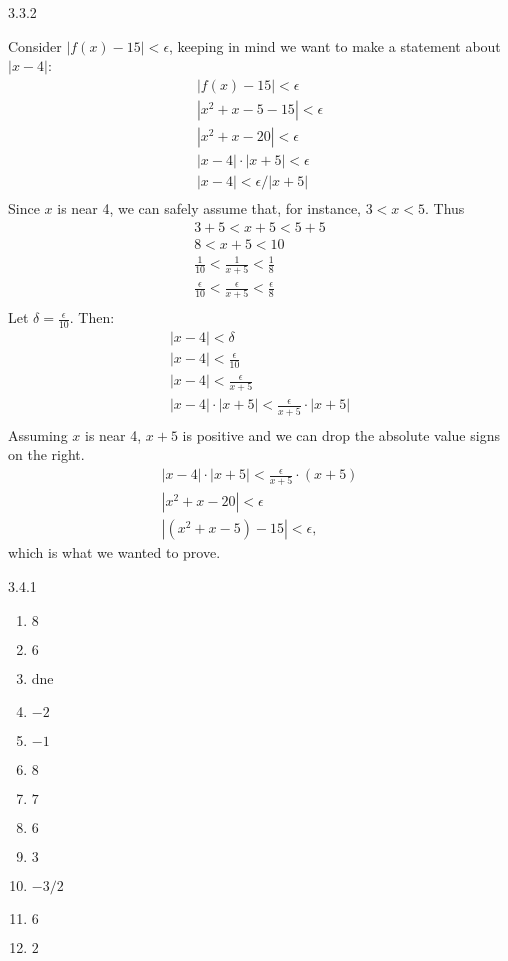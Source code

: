 \begin{Answer}{3.3.2}
\begin{enumerate}
{Consider $|f(x)-15|<\epsilon$, keeping in  mind we want to make a statement about $|x-4|$:
\begin{gather*}
|f(x) -15 | < \epsilon \\
|x^2+x-5 -15 |<\epsilon \\
| x^2+x-20 | < \epsilon \\
| x-4 |\cdot|x+5| < \epsilon \\
| x-4 | < \epsilon/|x+5| \\
\end{gather*}
Since $x$ is near 4, we can safely assume that, for instance, $3<x<5$. Thus
\begin{gather*}
3+5<x+5<5+5 \\
8 < x+5 < 10 \\
\frac{1}{10} < \frac{1}{x+5} < \frac{1}{8} \\
\frac{\epsilon}{10} < \frac{\epsilon}{x+5} < \frac{\epsilon}{8} \\
\end{gather*}
Let $\delta =\frac{\epsilon}{10}$. Then:
\begin{gather*}
|x-4|<\delta \\
|x-4| < \frac{\epsilon}{10}\\
|x-4| < \frac{\epsilon}{x+5}\\
|x-4|\cdot|x+5| < \frac{\epsilon}{x+5}\cdot|x+5|\\
\end{gather*}
Assuming $x$ is near 4, $x+5$ is positive and we can drop the absolute value signs on the right.
\begin{gather*}
|x-4|\cdot|x+5| < \frac{\epsilon}{x+5}\cdot(x+5)\\
|x^2+x-20| < \epsilon\\
|(x^2+x-5) -15| < \epsilon,
\end{gather*}
which is what we wanted to prove.
}

\end{enumerate}
\end{Answer}
\begin{Answer}{3.4.1}
\begin{multicols}{3}
\begin{enumerate}
	\item	$8$
	\item	$6$
	\item	dne
	\item	$-2$
	\item	$-1$
	\item	$8$
	\item	$7$
	\item	$6$
	\item	$3$
	\item	$-3/2$
	\item	$6$
	\item	$2$
\end{enumerate}
\end{multicols}
\end{Answer}
